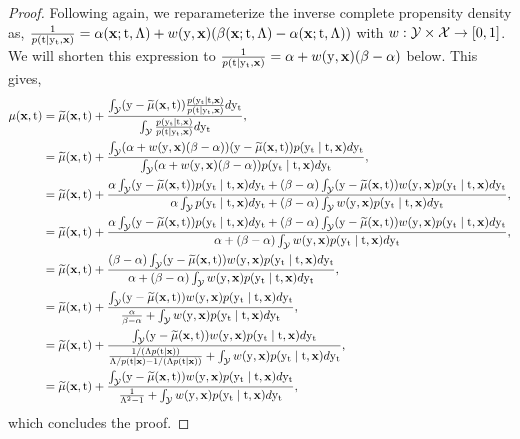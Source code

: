 \begin{lemma}
\begin{proof}
        Following \cite{kallus2019interval} again, we reparameterize the inverse complete propensity density as, $\frac{1}{p(\tf \mid \yt, \x)} = \alpha(\x; \tf, \Lambda) + w(\y, \x) (\beta(\x; \tf, \Lambda) - \alpha(\x; \tf, \Lambda))$ with $w : \Ycal\times \Xcal \to [0, 1]$. We will shorten this expression to $\frac{1}{p(\tf \mid \yt, \x)} = \alpha + w(\y, \x) (\beta - \alpha)$ below. This gives,
        \begin{subequations}
            \begin{align}
                \mu(\x, \tf)
                &= \mut(\x, \tf) + \frac{\int_{\Ycal} (\y - \mut(\x, \tf)) \frac{p(\yt \mid \tf, \x)}{p(\tf \mid \yt, \x)}d\yt}{\int_{\Ycal} \frac{p(\yt \mid \tf, \x)}{p(\tf \mid \yt, \x)}d\yt}, \\
                &= \mut(\x, \tf) + \frac{\int_{\Ycal} (\alpha + w(\y, \x) (\beta - \alpha))(\y - \mut(\x, \tf)) p(\yt \mid \tf, \x)d\yt}{\int_{\Ycal} (\alpha + w(\y, \x) (\beta - \alpha)) p(\yt \mid \tf, \x)d\yt}, \\
                &= \mut(\x, \tf) + \frac{\alpha\int_{\Ycal} (\y - \mut(\x, \tf)) p(\yt \mid \tf, \x)d\yt + (\beta - \alpha)\int_{\Ycal} (\y - \mut(\x, \tf)) w(\y, \x) p(\yt \mid \tf, \x)d\yt}{\alpha\int_{\Ycal} p(\yt \mid \tf, \x)d\yt + (\beta - \alpha)\int_{\Ycal} w(\y, \x) p(\yt \mid \tf, \x)d\yt}, \\
                &= \mut(\x, \tf) + \frac{\alpha\int_{\Ycal} (\y - \mut(\x, \tf)) p(\yt \mid \tf, \x)d\yt + (\beta - \alpha)\int_{\Ycal} (\y - \mut(\x, \tf)) w(\y, \x) p(\yt \mid \tf, \x)d\yt}{\alpha + (\beta - \alpha)\int_{\Ycal} w(\y, \x) p(\yt \mid \tf, \x)d\yt}, \\
                &= \mut(\x, \tf) + \frac{(\beta - \alpha)\int_{\Ycal} (\y - \mut(\x, \tf)) w(\y, \x) p(\yt \mid \tf, \x)d\yt}{\alpha + (\beta - \alpha)\int_{\Ycal} w(\y, \x) p(\yt \mid \tf, \x)d\yt}, \\
                &= \mut(\x, \tf) + \frac{\int_{\Ycal} (\y - \mut(\x, \tf)) w(\y, \x) p(\yt \mid \tf, \x)d\yt}{\frac{\alpha}{\beta - \alpha} + \int_{\Ycal} w(\y, \x) p(\yt \mid \tf, \x)d\yt}, \\
                &= \mut(\x, \tf) + \frac{\int_{\Ycal} (\y - \mut(\x, \tf)) w(\y, \x) p(\yt \mid \tf, \x)d\yt}{\frac{1 / (\Lambda p(\tf \mid \x))}{\Lambda / p(\tf \mid \x) - 1 / (\Lambda p(\tf \mid \x))} + \int_{\Ycal} w(\y, \x) p(\yt \mid \tf, \x)d\yt}, \\
                &= \mut(\x, \tf) + \frac{\int_{\Ycal} (\y - \mut(\x, \tf)) w(\y, \x) p(\yt \mid \tf, \x)d\yt}{\frac{1}{\Lambda^2 - 1} + \int_{\Ycal} w(\y, \x) p(\yt \mid \tf, \x)d\yt},
            \end{align}
        \end{subequations}
        which concludes the proof.
    \end{proof}
\end{lemma}